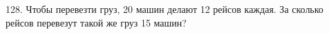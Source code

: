 128. Чтобы перевезти груз, 20 машин делают 12 рейсов каждая. За сколько рейсов перевезут такой же груз 15 машин?\\

